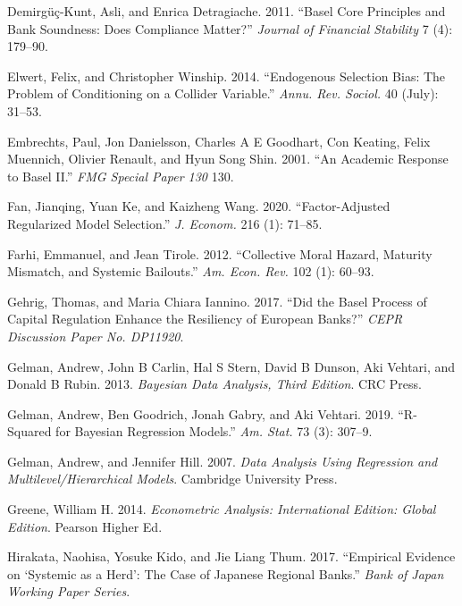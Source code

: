\documentclass[
  10pt,
]{article}
\begin{document}
\leavevmode\hypertarget{ref-Demirguc-Kunt2011}{}%
Demirgüç-Kunt, Asli, and Enrica Detragiache. 2011. ``Basel Core
Principles and Bank Soundness: Does Compliance Matter?'' \emph{Journal
of Financial Stability} 7 (4): 179--90.

\leavevmode\hypertarget{ref-Elwert2014}{}%
Elwert, Felix, and Christopher Winship. 2014. ``Endogenous Selection
Bias: The Problem of Conditioning on a Collider Variable.'' \emph{Annu.
Rev. Sociol.} 40 (July): 31--53.

\leavevmode\hypertarget{ref-Embrechts2001}{}%
Embrechts, Paul, Jon Danielsson, Charles A E Goodhart, Con Keating,
Felix Muennich, Olivier Renault, and Hyun Song Shin. 2001. ``An Academic
Response to Basel II.'' \emph{FMG Special Paper 130} 130.

\leavevmode\hypertarget{ref-Fan2020}{}%
Fan, Jianqing, Yuan Ke, and Kaizheng Wang. 2020. ``Factor-Adjusted
Regularized Model Selection.'' \emph{J. Econom.} 216 (1): 71--85.

\leavevmode\hypertarget{ref-Farhi2012}{}%
Farhi, Emmanuel, and Jean Tirole. 2012. ``Collective Moral Hazard,
Maturity Mismatch, and Systemic Bailouts.'' \emph{Am. Econ. Rev.} 102
(1): 60--93.

\leavevmode\hypertarget{ref-Gehrig2017}{}%
Gehrig, Thomas, and Maria Chiara Iannino. 2017. ``Did the Basel Process
of Capital Regulation Enhance the Resiliency of European Banks?''
\emph{CEPR Discussion Paper No. DP11920}.

\leavevmode\hypertarget{ref-Gelman2013}{}%
Gelman, Andrew, John B Carlin, Hal S Stern, David B Dunson, Aki Vehtari,
and Donald B Rubin. 2013. \emph{Bayesian Data Analysis, Third Edition}.
CRC Press.

\leavevmode\hypertarget{ref-Gelman2019}{}%
Gelman, Andrew, Ben Goodrich, Jonah Gabry, and Aki Vehtari. 2019.
``R-Squared for Bayesian Regression Models.'' \emph{Am. Stat.} 73 (3):
307--9.

\leavevmode\hypertarget{ref-Gelman2007}{}%
Gelman, Andrew, and Jennifer Hill. 2007. \emph{Data Analysis Using
Regression and Multilevel/Hierarchical Models}. Cambridge University
Press.

\leavevmode\hypertarget{ref-Greene2014}{}%
Greene, William H. 2014. \emph{Econometric Analysis: International
Edition: Global Edition}. Pearson Higher Ed.

\leavevmode\hypertarget{ref-Hirakata2017}{}%
Hirakata, Naohisa, Yosuke Kido, and Jie Liang Thum. 2017. ``Empirical
Evidence on `Systemic as a Herd': The Case of Japanese Regional Banks.''
\emph{Bank of Japan Working Paper Series}.
\end{document}
